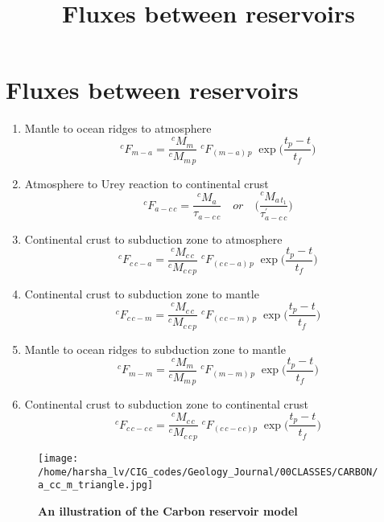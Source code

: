 \documentclass[14pt]{article}
\title{\textbf{Fluxes between reservoirs}}
\date{}
\begin{document}
\section*{Fluxes between reservoirs}
\thispagestyle{empty}
\begin{enumerate}
  \item Mantle to ocean ridges to atmosphere
    \begin{equation*}
      ^cF_{m-a} = \frac{^cM_m}{^cM_{m\,p}} \;^cF_{(m-a)\,p} \;\exp\Big(\frac{t_p - t}{t_f}\Big)
    \end{equation*}
  \item Atmosphere to Urey reaction to continental crust
    \begin{equation*}
      ^cF_{a-c\,c} = \frac{^cM_a}{\tau_{a-c\,c}} \quad or \quad \Big(\frac{^cM_{a\,t_1}}{\tau^{'}_{a-c\,c}}\Big)
    \end{equation*}
  \item Continental crust to subduction zone to atmosphere
     \begin{equation*}
       ^cF_{c\,c-a} = \frac{^cM_{c\,c}}{^cM_{c\,c\,p}} \;^cF_{(c\,c-a)\,p} \;\exp\Big({\frac{t_p - t}{t_f}}\Big)
     \end{equation*}  
  \item Continental crust to subduction zone to mantle
    \begin{equation*}
      ^cF_{c\,c-m} = \frac{^cM_{c\,c}}{^cM_{c\,c\,p}} \;^cF_{(c\,c-m)\,p} \;\exp\Big({\frac{t_p - t}{t_f}}\Big)
    \end{equation*}
  \item Mantle to ocean ridges to subduction zone to mantle
    \begin{equation*}
      ^cF_{m-m} = \frac{^cM_m}{^cM_{m\,p}} \;^cF_{(m-m)\,p} \;\exp\Big({\frac{t_p - t}{t_f}}\Big)
    \end{equation*}
  \item Continental crust to subduction zone to continental crust
    \begin{equation*}
      ^cF_{c\,c-c\,c} = \frac{^cM_{c\,c}}{^cM_{c\,c\,p}} \;^cF_{(c\,c-c\,c)p} \;\exp\Big({\frac{t_p - t}{t_f}}\Big)
    \end{equation*}
    
\end{enumerate}

\begin{figure}[t]
    \centering
    \texttt{[image: /home/harsha\_lv/CIG\_codes/Geology\_Journal/00CLASSES/CARBON/a\_cc\_m\_triangle.jpg]}
    \centering
    \caption*{\textbf{An illustration of the Carbon reservoir model}}
\end{figure}
\end{document}
